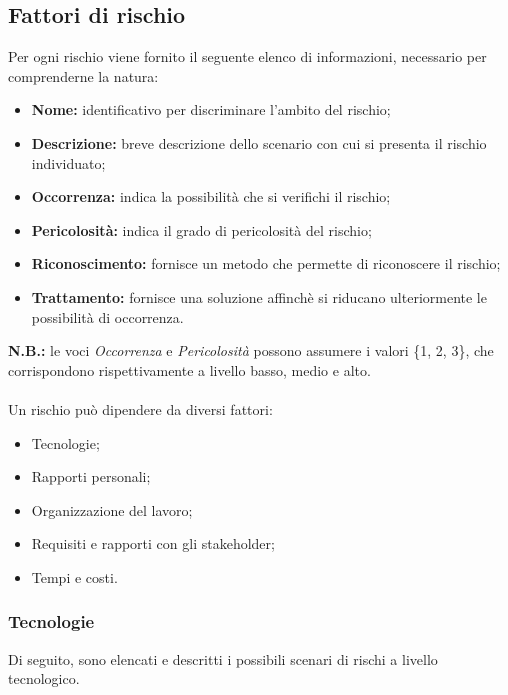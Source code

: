 \subsection{Fattori di rischio}

Per ogni rischio viene fornito il seguente elenco di informazioni, necessario per comprenderne la natura:
\begin{itemize}
	\item \textbf{Nome:} identificativo per discriminare l'ambito del rischio;
	\item \textbf{Descrizione:} breve descrizione dello scenario con cui si presenta il rischio individuato;
	\item \textbf{Occorrenza:} indica la possibilità che si verifichi il rischio;
	\item \textbf{Pericolosità:} indica il grado di pericolosità del rischio;
	\item \textbf{Riconoscimento:} fornisce un metodo che permette di riconoscere il rischio;
	\item \textbf{Trattamento:} fornisce una soluzione affinchè si riducano ulteriormente le possibilità di occorrenza.
\end{itemize}
\textbf{N.B.:} le voci \textit{Occorrenza} e \textit{Pericolosità} possono assumere i valori \{1, 2, 3\}, che corrispondono rispettivamente a livello basso, medio e alto.\\\\
Un rischio può dipendere da diversi fattori:
\begin{itemize}
	\item Tecnologie;
	\item Rapporti personali;
	\item Organizzazione del lavoro;
	\item Requisiti e rapporti con gli stakeholder;
	\item Tempi e costi.
\end{itemize}

\subsubsection{Tecnologie}

Di seguito, sono elencati e descritti i possibili scenari di rischi a livello tecnologico.

